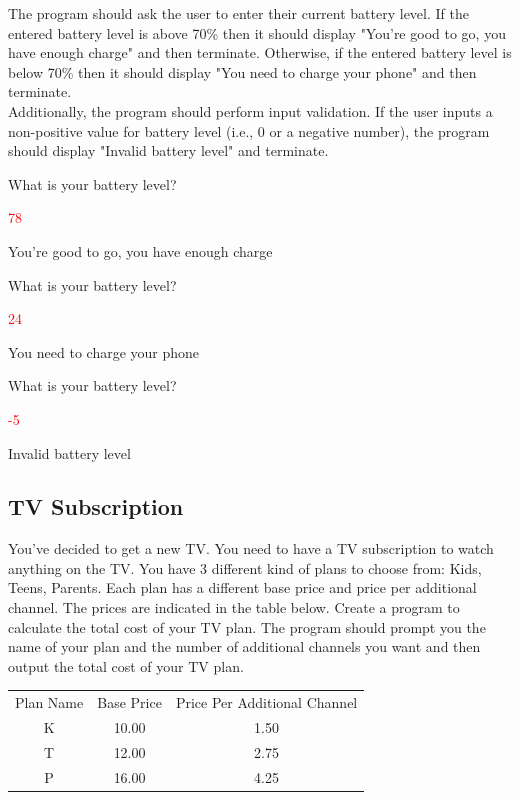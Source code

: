 The program should ask the user to enter their current battery level. If the entered battery level is above 70\% then it should display "You're good to go, you have enough charge" and then terminate. Otherwise, if the entered battery level is below 70\% then it should display "You need to charge your phone" and then terminate.\\ 


Additionally, the program should perform input validation. If the user inputs a non-positive value for battery level (i.e., 0 or a negative number), the program should display "Invalid battery level" and terminate.

\begin{sample} What is your battery level?

\textcolor{red}{78}

You're good to go, you have enough charge \end{sample}

\begin{sample} What is your battery level?

\textcolor{red}{24}

You need to charge your phone \end{sample}

\begin{sample} What is your battery level?

\textcolor{red}{-5}

Invalid battery level \end{sample}


\subsection{TV Subscription}

You've decided to get a new TV. You need to have a TV subscription to watch anything on the TV. You have 3 different kind of plans to choose from: Kids, Teens, Parents. Each plan has a different base price and price per additional channel. The prices are indicated in the table below. Create a program to calculate the total cost of your TV plan. The program should prompt you the name of your plan and the number of additional channels you want and then output the total cost of your TV plan.


\begin{table}[H]
    \centering
    \begin{tabular}{c|c|c}
        Plan Name & Base Price & Price Per Additional Channel \\
        K & 10.00 & 1.50 \\
        T & 12.00 & 2.75 \\
        P & 16.00 & 4.25
    \end{tabular}
\end{table}

